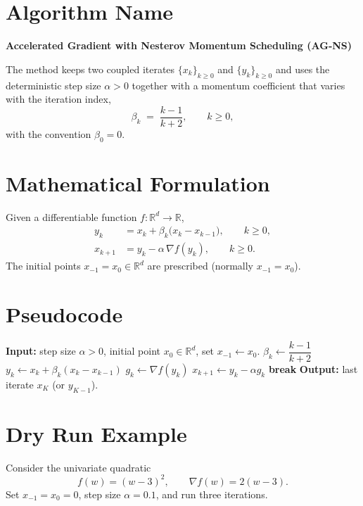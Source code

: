 \documentclass{article}
\newcommand{\R}{\mathbb{R}}
\begin{document}
\section*{Algorithm Name}
\textbf{Accelerated Gradient with Nesterov Momentum Scheduling (AG‑NS)}  

The method keeps two coupled iterates $\{x_k\}_{k\ge 0}$ and $\{y_k\}_{k\ge 0}$ and uses the deterministic step size $\alpha>0$ together with a momentum coefficient that varies with the iteration index,
\[
\beta_k \;=\; \frac{k-1}{k+2},\qquad k\ge 0,
\]
with the convention $\beta_0=0$.  

\section*{Mathematical Formulation}
Given a differentiable function $f:\R^d\rightarrow\R$,
\begin{align}
y_k &= x_k + \beta_k\bigl(x_k-x_{k-1}\bigr), \qquad k\ge 0, \label{eq:y}\\[4pt]
x_{k+1} &= y_k - \alpha \,\nabla f(y_k), \qquad k\ge 0. \label{eq:x}
\end{align}
The initial points $x_{-1}=x_0\in\R^d$ are prescribed (normally $x_{-1}=x_0$).  

\section*{Pseudocode}
\begin{algorithm}[H]
\caption{Accelerated Gradient with Nesterov Scheduling (AG‑NS)}
\begin{algorithmic}[1]
\STATE \textbf{Input:} step size $\alpha>0$, initial point $x_0\in\R^d$, set $x_{-1}\gets x_0$.
    \STATE $\beta_k \gets \dfrac{k-1}{k+2}$ 
    \STATE $y_k \gets x_k + \beta_k (x_k - x_{k-1})$ \label{alg:y}
    \STATE $g_k \gets \nabla f(y_k)$
    \STATE $x_{k+1} \gets y_k - \alpha g_k$ \label{alg:x}
        \STATE \textbf{break}
    \ENDIF
\ENDFOR
\STATE \textbf{Output:} last iterate $x_{K}$ (or $y_{K-1}$).
\end{algorithmic}
\end{algorithm}

\section*{Dry Run Example}
Consider the univariate quadratic
\[
f(w) = (w-3)^2,\qquad \nabla f(w)=2(w-3).
\]
Set $x_{-1}=x_0=0$, step size $\alpha=0.1$, and run three iterations.
\end{document}
